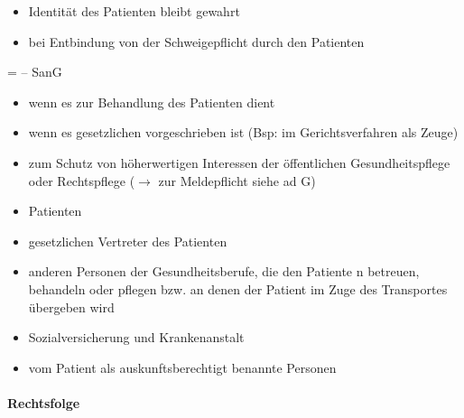 
\begin{itemize}
	\item {\mdseries
	Identität des Patienten bleibt gewahrt}

	\item {\mdseries
	bei Entbindung von der Schweigepflicht durch den Patienten}

\end{itemize}

 =   --
 SanG

\begin{itemize}
	\item {\mdseries
	wenn es zur Behandlung des Patienten dient}

	\item {\mdseries
	wenn es gesetzlichen vorgeschrieben ist (Bsp: im Gerichtsverfahren als
	Zeuge)}

	\item {\mdseries
	zum Schutz von h\"oherwertigen Interessen der \"offentlichen
	Gesundheitspflege oder Rechtspflege (${\rightarrow}$ zur Meldepflicht
	siehe ad G)}

\end{itemize}


\begin{itemize}
	\item {\mdseries
	Patienten}

	\item {\mdseries
	gesetzlichen Vertreter des Patienten}

	\item {\mdseries
	anderen Personen der Gesundheitsberufe, die den Patiente
n	betreuen, behandeln oder pflegen bzw. an denen der Patient
	im Zuge des Transportes \"ubergeben wird}

	\item {\mdseries
	Sozialversicherung und Krankenanstalt}

	\item {\mdseries
	vom Patient als auskunftsberechtigt benannte Personen}

\end{itemize}

\paragraph{Rechtsfolge}

